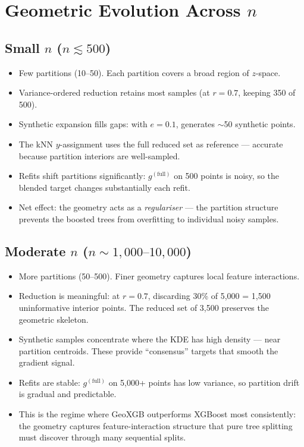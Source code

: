 \documentclass[11pt,a4paper]{article}
\theoremstyle{definition}
\begin{document}
\section{Geometric Evolution Across $n$}

\subsection{Small $n$ ($n \lesssim 500$)}

\begin{itemize}[nosep]
    \item Few partitions (10--50).  Each partition covers a broad region of $z$-space.
    \item Variance-ordered reduction retains most samples (at $r = 0.7$, keeping 350 of 500).
    \item Synthetic expansion fills gaps: with $e = 0.1$, generates $\sim$50 synthetic points.
    \item The kNN $y$-assignment uses the full reduced set as reference --- accurate because
        partition interiors are well-sampled.
    \item Refits shift partitions significantly: $g^{(\text{full})}$ on 500 points is noisy,
        so the blended target changes substantially each refit.
    \item Net effect: the geometry acts as a \emph{regulariser} --- the partition structure
        prevents the boosted trees from overfitting to individual noisy samples.
\end{itemize}

\subsection{Moderate $n$ ($n \sim 1{,}000\text{--}10{,}000$)}

\begin{itemize}[nosep]
    \item More partitions (50--500).  Finer geometry captures local feature interactions.
    \item Reduction is meaningful: at $r = 0.7$, discarding 30\% of 5{,}000 = 1{,}500
        uninformative interior points.  The reduced set of 3{,}500 preserves the geometric
        skeleton.
    \item Synthetic samples concentrate where the KDE has high density --- near partition
        centroids.  These provide ``consensus'' targets that smooth the gradient signal.
    \item Refits are stable: $g^{(\text{full})}$ on 5{,}000+ points has low variance,
        so partition drift is gradual and predictable.
    \item This is the regime where GeoXGB outperforms XGBoost most consistently:
        the geometry captures feature-interaction structure that pure tree splitting
        must discover through many sequential splits.
\end{itemize}
\end{document}
